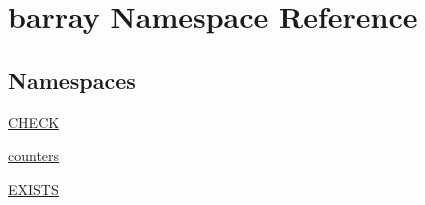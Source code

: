 \hypertarget{namespacebarray}{}\section{barray Namespace Reference}
\label{namespacebarray}
\subsection*{Namespaces}
\begin{DoxyCompactItemize}
\item 
 \hyperlink{namespacebarray_1_1_c_h_e_c_k}{C\+H\+E\+CK}
\item 
 \hyperlink{namespacebarray_1_1counters}{counters}
\item 
 \hyperlink{namespacebarray_1_1_e_x_i_s_t_s}{E\+X\+I\+S\+TS}
\end{DoxyCompactItemize}
